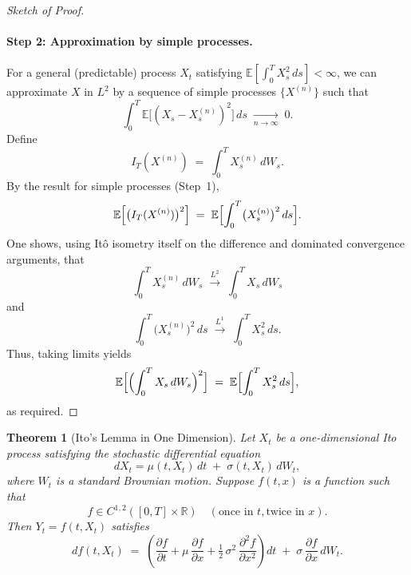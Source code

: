 \documentclass[a4paper,11pt]{book}
\newtheorem{theorem}{Theorem}[section]
\theoremstyle{definition}
\theoremstyle{remark}
\begin{document}
\begin{proof}[Sketch of Proof]
\paragraph{Step 2: Approximation by simple processes.}
For a general (predictable) process $X_t$ satisfying 
$\mathbb{E}[\int_0^T X_s^2\,ds] < \infty$, we can approximate $X$ in $L^2$ 
by a sequence of simple processes $\{X^{(n)}\}$ such that
\[
   \int_0^T \mathbb{E}\bigl[(X_s - X_s^{(n)})^2\bigr]\,ds 
   \;\xrightarrow[n\to\infty]{}\; 0.
\]
Define 
\[
   I_T(X^{(n)}) \;=\; \int_0^T X_s^{(n)} \, dW_s.
\]
By the result for simple processes (Step~1),
\[
   \mathbb{E}\Bigl[\bigl(I_T(X^{(n)})\bigr)^2\Bigr]
   \;=\;
   \mathbb{E}\Bigl[\int_0^T \bigl(X_s^{(n)}\bigr)^2 \, ds\Bigr].
\]
One shows, using It\^o isometry itself on the difference and 
dominated convergence arguments, that
\[
   \int_0^T X_s^{(n)} \, dW_s 
   \;\xrightarrow{L^2}\;
   \int_0^T X_s \, dW_s
\]
and
\[
   \int_0^T \bigl(X_s^{(n)}\bigr)^2 \, ds
   \;\xrightarrow{L^1}\;
   \int_0^T X_s^2 \, ds.
\]
Thus, taking limits yields
\[
   \mathbb{E}\Bigl[\Bigl(\int_0^T X_s \, dW_s\Bigr)^2\Bigr]
   \;=\;
   \mathbb{E}\Bigl[\int_0^T X_s^2 \, ds\Bigr],
\]
as required.
\end{proof}

\begin{theorem}[Ito's Lemma in One Dimension]
\label{thm:Ito}
Let $X_t$ be a one-dimensional Ito process satisfying the stochastic differential equation
\[
   dX_t = \mu(t, X_t)\,dt \;+\; \sigma(t, X_t)\, dW_t,
\]
where $W_t$ is a standard Brownian motion. Suppose $f(t, x)$ is a function such that
\[
   f \in C^{1,2}([0,T] \times \mathbb{R}) 
   \quad(\text{once in } t, \text{twice in } x).
\]
Then $Y_t = f(t, X_t)$ satisfies
\[
   df(t, X_t)
   \;=\;
   \left(
     \frac{\partial f}{\partial t} 
     + \mu \,\frac{\partial f}{\partial x} 
     + \tfrac{1}{2}\,\sigma^2 \,\frac{\partial^2 f}{\partial x^2}
   \right)\!dt
   \;+\;
   \sigma \,\frac{\partial f}{\partial x}\,dW_t.
\]
\end{theorem}
\end{document}
